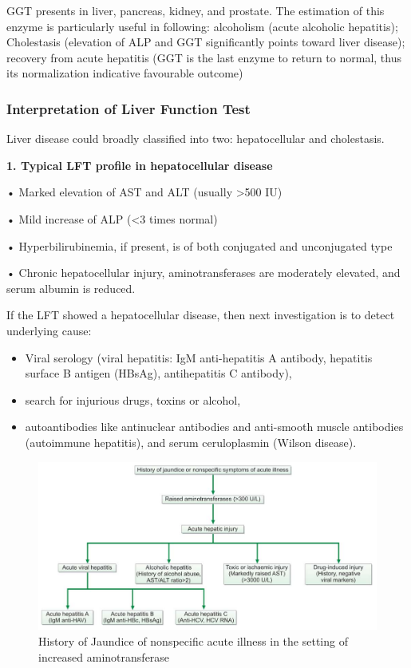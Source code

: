 \documentclass[
  letterpaper,
  DIV=11,
  numbers=noendperiod]{scrreprt}
\providecommand{\tightlist}{%
  \setlength{\itemsep}{0pt}\setlength{\parskip}{0pt}}\usepackage{longtable,booktabs,array}
\begin{document}
GGT presents in liver, pancreas, kidney, and prostate. The estimation of
this enzyme is particularly useful in following: alcoholism (acute
alcoholic hepatitis); Cholestasis (elevation of ALP and GGT
significantly points toward liver disease); recovery from acute
hepatitis (GGT is the last enzyme to return to normal, thus its
normalization indicative favourable outcome)

\subsubsection{Interpretation of Liver Function
Test}\label{interpretation-of-liver-function-test}

Liver disease could broadly classified into two: hepatocellular and
cholestasis.

\textbf{1. Typical LFT profile in hepatocellular disease}

• Marked elevation of AST and ALT (usually \textgreater500 IU)

• Mild increase of ALP (\textless3 times normal)

• Hyperbilirubinemia, if present, is of both conjugated and unconjugated
type

• Chronic hepatocellular injury, aminotransferases are moderately
elevated, and serum albumin is reduced.

If the LFT showed a hepatocellular disease, then next investigation is
to detect underlying cause:

\begin{itemize}
\tightlist
\item
  Viral serology (viral hepatitis: IgM anti-hepatitis A antibody,
  hepatitis surface B antigen (HBsAg), antihepatitis C antibody),
\item
  search for injurious drugs, toxins or alcohol,
\item
  autoantibodies like antinuclear antibodies and anti-smooth muscle
  antibodies (autoimmune hepatitis), and serum ceruloplasmin (Wilson
  disease).
\end{itemize}

\begin{figure}

{\centering \includegraphics{image/hepatocellular_injury.png}

}

\caption{History of Jaundice of nonspecific acute illness in the setting
of increased aminotransferase}

\end{figure}%
\end{document}
